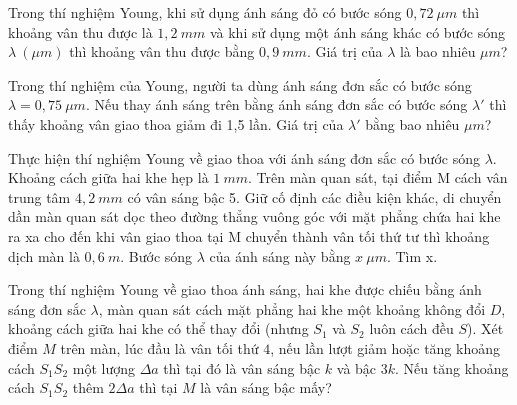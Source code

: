 \setcounter{ex}{0}
\PhanIII
\begin{ex}
Trong thí nghiệm Young, khi sử dụng ánh sáng đỏ có bước sóng $0,72\ \mu m$ thì khoảng vân thu được là $1,2\ mm$ và khi sử dụng một ánh sáng khác có bước sóng $\lambda\ (\mu m)$ thì khoảng vân thu được bằng $0,9\ mm$. Giá trị của $\lambda$ là bao nhiêu $\mu m$?
\loigiai{ }
\end{ex}
\begin{ex}
Trong thí nghiệm của Young, người ta dùng ánh sáng đơn sắc có bước sóng $\lambda=0,75\ \mu m$. Nếu thay ánh sáng trên bằng ánh sáng đơn sắc có bước sóng $\lambda'$ thì thấy khoảng vân giao thoa giảm đi 1,5 lần. Giá trị của $\lambda'$ bằng bao nhiêu $\mu m$?\\
\end{ex} 
\begin{ex}
Thực hiện thí nghiệm Young về giao thoa với ánh sáng đơn sắc có bước sóng $\lambda$. Khoảng cách giữa hai khe hẹp là $1 \  mm$. Trên màn quan sát, tại điểm M cách vân trung tâm $4,2 \  mm$ có vân sáng bậc 5. Giữ cố định các điều kiện khác, di chuyển dần màn quan sát dọc theo đường thẳng vuông góc với mặt phẳng chứa hai khe ra xa cho đến khi vân giao thoa tại M chuyển thành vân tối thứ tư thì khoảng dịch màn là $0,6 \   m$. Bước sóng $\lambda$ của ánh sáng này bằng $x\ \mu m$. Tìm x.
\end{ex}
\begin{ex}
Trong thí nghiệm Young về giao thoa ánh sáng,  hai khe được chiếu bằng ánh sáng đơn sắc $\lambda$, màn quan sát cách mặt phẳng hai khe một khoảng không đổi $D$, khoảng cách giữa hai khe có thể thay đổi (nhưng $S_1$ và $S_2$ luôn cách đều $S$). Xét điểm $M$ trên màn, lúc đầu là vân tối thứ $4$, nếu lần lượt giảm hoặc tăng khoảng cách $S_1S_2$ một lượng $\Delta a$ thì tại đó là vân sáng bậc $k$ và bậc $3k$. Nếu tăng khoảng cách $S_1S_2$ thêm $2\Delta a$ thì tại $M$ là vân sáng bậc mấy?
\end{ex}
